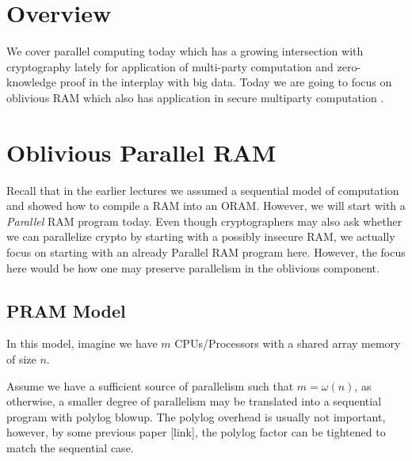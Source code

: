 \newcommand{\rsmpl}{\xleftarrow{\$}}

\newcommand{\alg}{\textsc{Alg}}

\newcommand{\ap}{\textsc{AccessPattern}}
\newtheorem{nonexample}[theorem]{Non-Example}


\section{Overview}
We cover parallel computing today which has a growing intersection with cryptography lately for application of multi-party computation and zero-knowledge proof in the interplay with big data. Today we are going to focus on oblivious RAM which also has application in secure multiparty computation \cite{cryptoeprint:2016/1084, cryptoeprint:2020/604}.

\section{Oblivious Parallel RAM}
    Recall that in the earlier lectures we assumed  a sequential model of computation and showed how to compile a RAM into an ORAM. However, we will start with a \emph{Parallel} RAM program today. Even though cryptographers may also ask whether we can parallelize crypto by starting with a possibly insecure RAM, we actually focus on starting with an already Parallel RAM program here. However, the focus here would be how one may preserve parallelism in the oblivious component. 
    
    \subsection{PRAM Model}
    In this model, imagine we have $m$ CPUs/Processors with a shared array memory of size $n$.
    \begin{remark}
    	Assume we have a sufficient source of parallelism such that $m= \omega(n)$, as otherwise, a smaller degree of parallelism may be translated into a sequential program with polylog blowup. The polylog overhead is usually not important, however, by some previous paper [link], the polylog factor can be tightened to match the sequential case.
     \end{remark} 
    
